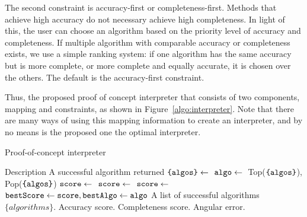 The second constraint is accuracy-first or completeness-first. Methods that achieve high accuracy do not necessary achieve high completeness. In light of this, the user can choose an algorithm based on the priority level of accuracy and completeness. If multiple algorithm with comparable accuracy or completeness exists, we use a simple ranking system: if one algorithm has the same accuracy but is more complete, or more complete and equally accurate, it is chosen over the others. The default is the accuracy-first constraint.

Thus, the proposed proof of concept interpreter that consists of two components, mapping and constraints, as shown in Figure~\ref{algo:interpreter}. Note that there are many ways of using this mapping information to create an interpreter, and by no means is the proposed one the optimal interpreter.
\begin{algorithm}[!htbp]
\caption{Proof-of-concept interpreter}
\begin{algorithmic}
  \Require Description 
  \Ensure A successful algorithm  returned
  \State $\texttt{\{algos\}} \leftarrow{}$ 
    \State $\texttt{algo} \leftarrow{}$ Top($\texttt{\{algos\}}$), Pop($\texttt{\{algos\}}$)
        \State $\texttt{score} \leftarrow{}$ 
        \State $\texttt{score} \leftarrow{}$ 
      \EndIf
      \State $\texttt{score} \leftarrow{}$ 
    \EndIf
      \State $\texttt{bestScore}\leftarrow{}\texttt{score}, \texttt{bestAlgo}\leftarrow{}\texttt{algo}$
    \EndIf
  \EndWhile
  \State 
    \State\Return A list of successful algorithms $\{algorithms\}$.
  \EndFunction
  \State 
      \State\Return Accuracy score.
      \State\Return Completeness score.
    \EndIf
    \State\Return Angular error.
  \EndFunction
\end{algorithmic}
\label{algo:interpreter}
\end{algorithm}


